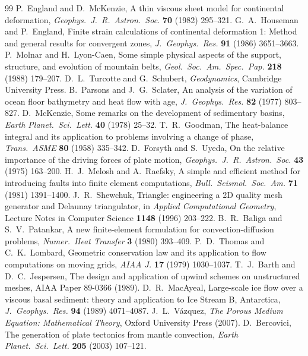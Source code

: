 \documentclass[11pt]{article}
\begin{document}
\begin{thebibliography}{99}
 P.~England and D.~McKenzie, A thin viscous sheet model for continental deformation, \emph{Geophys.\ J.\ R.\ Astron.\ Soc.} \textbf{70} (1982) 295--321.
 G.~A.~Houseman and P.~England, Finite strain calculations of continental deformation 1: Method and general results for convergent zones, \emph{J.\ Geophys.\ Res.} \textbf{91} (1986) 3651--3663.
 P.~Molnar and H.~Lyon-Caen, Some simple physical aspects of the support, structure, and evolution of mountain belts, \emph{Geol.\ Soc.\ Am.\ Spec.\ Pap.} \textbf{218} (1988) 179--207.
 D.~L.~Turcotte and G.~Schubert, \emph{Geodynamics}, Cambridge University Press.
 B.~Parsons and J.~G.~Sclater, An analysis of the variation of ocean floor bathymetry and heat flow with age, \emph{J.\ Geophys.\ Res.} \textbf{82} (1977) 803--827.
 D.~McKenzie, Some remarks on the development of sedimentary basins, \emph{Earth Planet.\ Sci.\ Lett.} \textbf{40} (1978) 25--32.
 T.~R.~Goodman, The heat-balance integral and its application to problems involving a change of phase, \emph{Trans.\ ASME} \textbf{80} (1958) 335--342.
 D.~Forsyth and S.~Uyeda, On the relative importance of the driving forces of plate motion, \emph{Geophys.\ J.\ R.\ Astron.\ Soc.} \textbf{43} (1975) 163--200.
 H.~J.~Melosh and A.~Raefsky, A simple and efficient method for introducing faults into finite element computations, \emph{Bull.\ Seismol.\ Soc.\ Am.} \textbf{71} (1981) 1391--1400.
 J.~R.~Shewchuk, Triangle: engineering a 2D quality mesh generator and Delaunay triangulator, in \emph{Applied Computational Geometry}, Lecture Notes in Computer Science \textbf{1148} (1996) 203--222.
 B.~R.~Baliga and S.~V.~Patankar, A new finite-element formulation for convection-diffusion problems, \emph{Numer.\ Heat Transfer} \textbf{3} (1980) 393--409.
 P.~D.~Thomas and C.~K.~Lombard, Geometric conservation law and its application to flow computations on moving grids, \emph{AIAA J.} \textbf{17} (1979) 1030--1037.
 T.~J.~Barth and D.~C.~Jespersen, The design and application of upwind schemes on unstructured meshes, AIAA Paper 89-0366 (1989).
 D.~R.~MacAyeal, Large-scale ice flow over a viscous basal sediment: theory and application to Ice Stream B, Antarctica, \emph{J.\ Geophys.\ Res.} \textbf{94} (1989) 4071--4087.
 J.~L.~V\'azquez, \emph{The Porous Medium Equation: Mathematical Theory}, Oxford University Press (2007).
 D.~Bercovici, The generation of plate tectonics from mantle convection, \emph{Earth Planet.\ Sci.\ Lett.} \textbf{205} (2003) 107--121.
\end{thebibliography}
\end{document}
